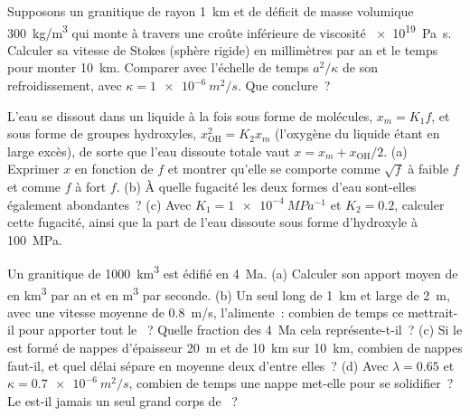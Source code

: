 \begin{exercise}[$\star\star$]\label{exo:b2:magma-emplacement:9}
Supposons un  granitique de rayon \qty{1}{km} et de déficit de masse volumique
\qty{300}{kg/m^3} qui monte à travers une croûte inférieure de viscosité \qty{e19}{Pa.s}. Calculer
sa vitesse de Stokes (sphère rigide) en millimètres par an et le temps pour monter
\qty{10}{km}. Comparer avec l'échelle de temps $a^2/\kappa$ de son refroidissement, avec $\kappa
= \qty{1e-6}{m^2/s}$. Que conclure~?
\end{exercise}

\begin{exercise}[$\star\star\star$]\label{exo:b2:magma-emplacement:10}
L'eau se dissout dans un liquide à la fois sous forme de molécules, $x_m = K_1 f$, et sous forme de
groupes hydroxyles, $x_{\mathrm{OH}}^2 = K_2 x_m$ (l'oxygène du liquide étant en large excès), de sorte que
l'eau dissoute totale vaut $x = x_m + x_{\mathrm{OH}}/2$. (a) Exprimer $x$ en
fonction de $f$ et montrer qu'elle se comporte comme $\sqrt f$ à faible $f$ et comme $f$ à
fort $f$. (b) À quelle fugacité les deux formes d'eau sont-elles également abondantes~? (c)
Avec $K_1 = \qty{1e-4}{MPa^{-1}}$ et $K_2 = 0.2$, calculer cette fugacité, ainsi que la
part de l'eau dissoute sous forme d'hydroxyle à \qty{100}{MPa}.
\end{exercise}

\begin{exercise}[$\star\star\star$]\label{exo:b2:magma-emplacement:11}
Un  granitique de \qty{1000}{km^3} est édifié en \qty{4}{Ma}. (a) Calculer
son apport moyen de  en \unit{km^3} par an et en \unit{m^3} par seconde. (b) Un
seul  long de \qty{1}{km} et large de \qty{2}{m}, avec une vitesse moyenne de
\qty{0.8}{m/s}, l'alimente~: combien de temps ce  mettrait-il pour apporter tout le
~? Quelle fraction des \qty{4}{Ma} cela représente-t-il~? (c) Si le  est formé de
nappes d'épaisseur \qty{20}{m} et de \qty{10}{km} sur \qty{10}{km}, combien de nappes
faut-il, et quel délai sépare en moyenne deux d'entre elles~? (d) Avec
$\lambda = 0.65$ et $\kappa = \qty{0.7e-6}{m^2/s}$, combien de temps une nappe met-elle pour
se solidifier~? Le  est-il jamais un seul grand corps de ~?
\end{exercise}

